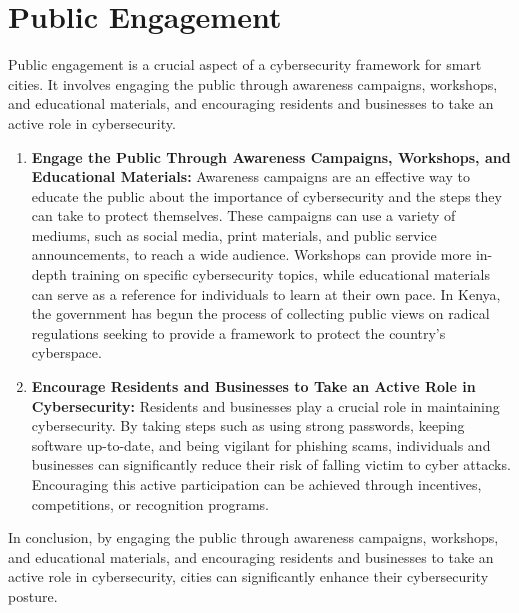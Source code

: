 \documentclass{article}
\begin{document}
\section{Public Engagement}
Public engagement is a crucial aspect of a cybersecurity framework for smart cities. It involves engaging the public through awareness campaigns, workshops, and educational materials, and encouraging residents and businesses to take an active role in cybersecurity\cite{the-european-union-agency-for-cybersecurity-enisa-2016}\cite{lostri-2022}\cite{cybersecurity-and-infrastructure-security-agency-2021}.
\begin{enumerate}[label=\alph*)]
    \item \textbf{Engage the Public Through Awareness Campaigns, Workshops, and Educational Materials:} Awareness campaigns are an effective way to educate the public about the importance of cybersecurity and the steps they can take to protect themselves\cite{the-european-union-agency-for-cybersecurity-enisa-2016}\cite{lostri-2022}\cite{cybersecurity-and-infrastructure-security-agency-2021}. These campaigns can use a variety of mediums, such as social media, print materials, and public service announcements, to reach a wide audience\cite{the-european-union-agency-for-cybersecurity-enisa-2016}\cite{lostri-2022}\cite{cybersecurity-and-infrastructure-security-agency-2021}. Workshops can provide more in-depth training on specific cybersecurity topics, while educational materials can serve as a reference for individuals to learn at their own pace\cite{the-european-union-agency-for-cybersecurity-enisa-2016}\cite{lostri-2022}\cite{cybersecurity-and-infrastructure-security-agency-2021}. In Kenya, the government has begun the process of collecting public views on radical regulations seeking to provide a framework to protect the country’s cyberspace\cite{mbaka-2023}.
    \item \textbf{Encourage Residents and Businesses to Take an Active Role in Cybersecurity:} Residents and businesses play a crucial role in maintaining cybersecurity\cite{the-european-union-agency-for-cybersecurity-enisa-2016}\cite{lostri-2022}\cite{cybersecurity-and-infrastructure-security-agency-2021}. By taking steps such as using strong passwords, keeping software up-to-date, and being vigilant for phishing scams, individuals and businesses can significantly reduce their risk of falling victim to cyber attacks\cite{the-european-union-agency-for-cybersecurity-enisa-2016}\cite{lostri-2022}\cite{cybersecurity-and-infrastructure-security-agency-2021}. Encouraging this active participation can be achieved through incentives, competitions, or recognition programs\cite{the-european-union-agency-for-cybersecurity-enisa-2016}\cite{lostri-2022}\cite{cybersecurity-and-infrastructure-security-agency-2021}.


\end{enumerate}
In conclusion, by engaging the public through awareness campaigns, workshops, and educational materials, and encouraging residents and businesses to take an active role in cybersecurity, cities can significantly enhance their cybersecurity posture\cite{the-european-union-agency-for-cybersecurity-enisa-2016}\cite{lostri-2022}\cite{cybersecurity-and-infrastructure-security-agency-2021}.
\end{document}
